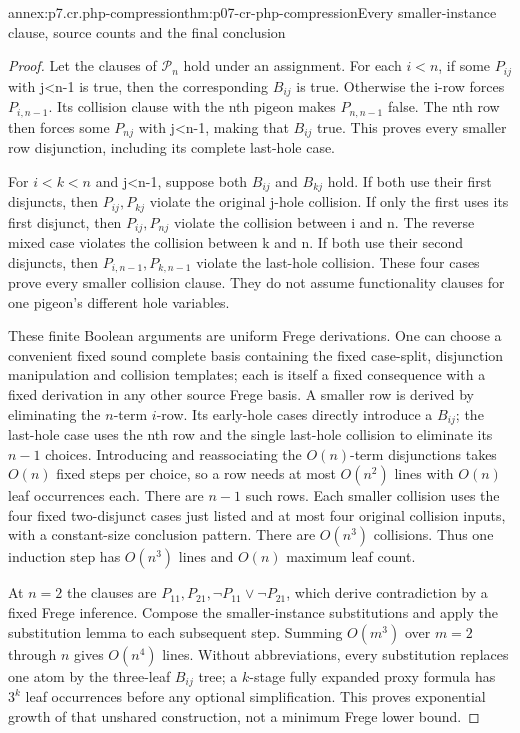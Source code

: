 \begin{annexitem}{annex:p7.cr.php-compression}{thm:p07-cr-php-compression}{Every smaller-instance clause, source counts and the final conclusion}
\begin{proof}
Let the clauses of \(\mathcal P_n\) hold under an assignment.
For each \(i<n\), if some \(P_{ij}\) with j<n-1 is true,
then the corresponding \(B_{ij}\) is true. Otherwise the
i-row forces \(P_{i,n-1}\). Its collision clause with the
nth pigeon makes \(P_{n,n-1}\) false. The nth row then forces
some \(P_{nj}\) with j<n-1, making that \(B_{ij}\) true.
This proves every smaller row disjunction, including its
complete last-hole case.

For \(i<k<n\) and j<n-1, suppose both \(B_{ij}\) and
\(B_{kj}\) hold. If both use their first disjuncts, then
\(P_{ij},P_{kj}\) violate the original j-hole collision.
If only the first uses its first disjunct, then
\(P_{ij},P_{nj}\) violate the collision between i and n.
The reverse mixed case violates the collision between k and n.
If both use their second disjuncts, then
\(P_{i,n-1},P_{k,n-1}\) violate the last-hole collision.
These four cases prove every smaller collision clause.
They do not assume functionality clauses for one pigeon's
different hole variables.

These finite Boolean arguments are uniform Frege derivations.
One can choose a convenient fixed sound complete basis containing
the fixed case-split, disjunction manipulation and collision
templates; each is itself a fixed consequence with a fixed
derivation in any other source Frege basis. A smaller row is
derived by eliminating the \(n\)-term \(i\)-row. Its early-hole cases
directly introduce a \(B_{ij}\); the last-hole case uses the
nth row and the single last-hole collision to eliminate its
\(n-1\) choices. Introducing and reassociating the \(O(n)\)-term
disjunctions takes \(O(n)\) fixed steps per choice, so a row needs
at most \(O(n^2)\) lines with \(O(n)\) leaf occurrences each.
There are \(n-1\) such rows. Each smaller collision uses the four
fixed two-disjunct cases just listed and at most four original
collision inputs, with a constant-size conclusion pattern.
There are \(O(n^3)\) collisions. Thus one induction step has
\(O(n^3)\) lines and \(O(n)\) maximum leaf count.

At \(n=2\) the clauses are \(P_{11},P_{21},
\neg P_{11}\lor\neg P_{21}\), which derive contradiction
by a fixed Frege inference. Compose the smaller-instance
substitutions and apply the substitution lemma to each subsequent
step. Summing \(O(m^3)\) over \(m=2\) through \(n\) gives \(O(n^4)\) lines.
Without abbreviations, every substitution replaces one atom
by the three-leaf \(B_{ij}\) tree; a \(k\)-stage fully expanded
proxy formula has \(3^k\) leaf occurrences before any
optional simplification. This proves exponential growth of
that unshared construction, not a minimum Frege lower bound.


\end{proof}
\end{annexitem}
